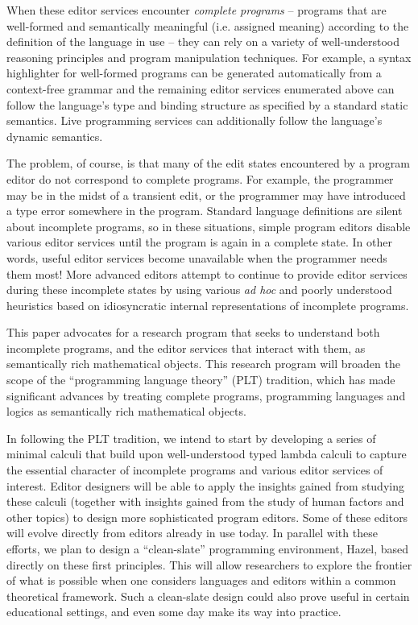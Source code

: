 \documentclass[letterpaper,USenglish]{lipics-v2016}
\newcommand{\Hazel}[0]{\textsf{Hazel}}
\begin{document}
When these editor services encounter \emph{complete programs} -- programs that are well-formed and semantically meaningful (i.e. assigned meaning) according to the definition of the language in use -- they can rely on a variety of well-understood reasoning principles and program manipulation techniques. For example, a syntax highlighter for well-formed programs can be generated automatically 
from a context-free grammar \cite{DBLP:conf/tools/KrahnRV08,DBLP:conf/cc/BrandDHJJKKMOSVVV01} and the remaining editor services enumerated above can follow the language's type and binding structure as specified by a standard static
semantics. Live programming services can additionally follow the language's dynamic semantics.

The problem, of course, is that many of the {edit states} encountered by a program editor do not correspond to complete programs. For example, the programmer may be in the midst of a transient edit, or the programmer may have introduced a type error somewhere in the program. Standard language definitions are silent about incomplete programs, so in these situations, simple program editors disable various editor services until the program is again in a complete state. In other words, useful editor services become unavailable when the programmer needs them most! More advanced editors attempt to continue to provide editor services during these incomplete states by using various \emph{ad hoc} and poorly understood heuristics based on idiosyncratic internal representations of  incomplete programs.

This paper advocates for a research program that seeks to understand both incomplete programs, and the editor services that interact with them, as semantically rich mathematical objects. This research program will broaden the scope of the ``programming language theory'' (PLT) tradition, which has made significant advances by treating complete programs, programming languages and logics as semantically rich mathematical objects.

In following the PLT tradition, we intend to start by developing a series of minimal calculi that build upon well-understood typed lambda calculi to capture the essential character of incomplete programs and various editor services of interest. Editor designers will be able to apply the insights gained from studying these calculi (together with insights gained from the study of human factors and other topics) to design more sophisticated program editors. Some of these editors will evolve directly from editors already in use today. In parallel with these efforts, we plan to design a ``clean-slate'' programming environment, \Hazel, based directly on these first principles. 
%
This will allow researchers to explore the frontier of what is possible when one considers languages and editors within a common theoretical framework. 
%
Such a clean-slate design could also prove useful in certain educational settings, and even some day make its way into practice.
\end{document}
